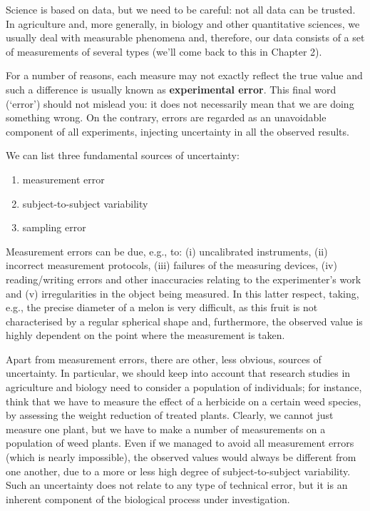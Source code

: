 \documentclass[a4paper,12pt,oneside]{book}
\providecommand{\tightlist}{%
  \setlength{\itemsep}{0pt}\setlength{\parskip}{0pt}}
\begin{document}
Science is based on data, but we need to be careful: not all data can be trusted. In agriculture and, more generally, in biology and other quantitative sciences, we usually deal with measurable phenomena and, therefore, our data consists of a set of measurements of several types (we'll come back to this in Chapter 2).

For a number of reasons, each measure may not exactly reflect the true value and such a difference is usually known as \textbf{experimental error}. This final word (`error') should not mislead you: it does not necessarily mean that we are doing something wrong. On the contrary, errors are regarded as an unavoidable component of all experiments, injecting uncertainty in all the observed results.

We can list three fundamental sources of uncertainty:

\begin{enumerate}
\def\labelenumi{\arabic{enumi}.}
\tightlist
\item
  measurement error
\item
  subject-to-subject variability
\item
  sampling error
\end{enumerate}

Measurement errors can be due, e.g., to: (i) uncalibrated instruments, (ii) incorrect measurement protocols, (iii) failures of the measuring devices, (iv) reading/writing errors and other inaccuracies relating to the experimenter's work and (v) irregularities in the object being measured. In this latter respect, taking, e.g., the precise diameter of a melon is very difficult, as this fruit is not characterised by a regular spherical shape and, furthermore, the observed value is highly dependent on the point where the measurement is taken.

Apart from measurement errors, there are other, less obvious, sources of uncertainty. In particular, we should keep into account that research studies in agriculture and biology need to consider a population of individuals; for instance, think that we have to measure the effect of a herbicide on a certain weed species, by assessing the weight reduction of treated plants. Clearly, we cannot just measure one plant, but we have to make a number of measurements on a population of weed plants. Even if we managed to avoid all measurement errors (which is nearly impossible), the observed values would always be different from one another, due to a more or less high degree of subject-to-subject variability. Such an uncertainty does not relate to any type of technical error, but it is an inherent component of the biological process under investigation.
\end{document}
